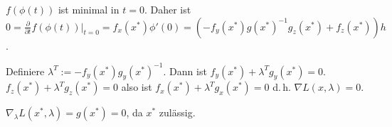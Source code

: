 $f(\phi(t))$ ist minimal in $t=0$. Daher ist $0 = \frac{\partial}{\partial t} f(\phi(t))|_{t=0} = f_x(x^*) \phi'(0) = (-f_y(x^*) g(x^*)^{-1} g_z(x^*) + f_z(x^*))h$.

Definiere $\lambda^T := -f_y(x^*)g_y(x^*)^{-1}$. Dann ist $f_y(x^*) + \lambda^T g_y(x^*) = 0$. $f_z(x^*) + \lambda^T g_z(x^*) = 0$ also ist $f_x(x^*) + \lambda^T g_x(x^*) = 0$ d.\,h. $\nabla L(x,\lambda)=0$.

$\nabla_\lambda L(x^*,\lambda) = g(x^*) = 0$, da $x^*$ zulässig.












